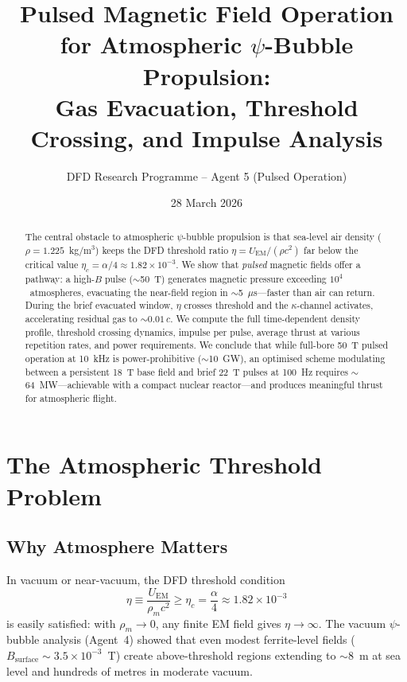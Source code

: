 \documentclass[amsmath,amssymb,aps,prd,superscriptaddress,nofootinbib]{revtex4-2}
\newcommand{\etac}{\eta_c}
\begin{document}
\title{Pulsed Magnetic Field Operation for Atmospheric $\psi$-Bubble Propulsion:\\
Gas Evacuation, Threshold Crossing, and Impulse Analysis}

\author{DFD Research Programme -- Agent 5 (Pulsed Operation)}
\date{28 March 2026}

\begin{abstract}
The central obstacle to atmospheric $\psi$-bubble propulsion is that
sea-level air density ($\rho = 1.225$~kg/m$^3$) keeps the DFD
threshold ratio $\eta = U_\text{EM}/(\rho c^2)$ far below the critical
value $\etac = \alpha/4 \approx 1.82 \times 10^{-3}$. We show that
\emph{pulsed} magnetic fields offer a pathway: a high-$B$ pulse
($\sim$50~T) generates magnetic pressure exceeding $10^4$~atmospheres,
evacuating the near-field region in $\sim$5~$\mu$s---faster than air can
return. During the brief evacuated window, $\eta$ crosses threshold and
the $\kappa$-channel activates, accelerating residual gas to $\sim
0.01\,c$. We compute the full time-dependent density profile, threshold
crossing dynamics, impulse per pulse, average thrust at various
repetition rates, and power requirements. We conclude that while
full-bore 50~T pulsed operation at 10~kHz is power-prohibitive ($\sim$10~GW),
an optimised scheme modulating between a persistent 18~T base field and
brief 22~T pulses at 100~Hz requires $\sim$64~MW---achievable with a
compact nuclear reactor---and produces meaningful thrust for atmospheric
flight.
\end{abstract}

\maketitle

\section{The Atmospheric Threshold Problem}\label{sec:problem}

\subsection{Why Atmosphere Matters}

In vacuum or near-vacuum, the DFD threshold condition
\begin{equation}\label{eq:threshold}
\eta \equiv \frac{U_\text{EM}}{\rho_m c^2} \geq \etac = \frac{\alpha}{4}
\approx 1.82 \times 10^{-3}
\end{equation}
is easily satisfied: with $\rho_m \to 0$, any finite EM field
gives $\eta \to \infty$. The vacuum $\psi$-bubble analysis (Agent~4)
showed that even modest ferrite-level fields ($B_\text{surface} \sim
3.5 \times 10^{-3}$~T) create above-threshold regions extending to
$\sim$8~m at sea level and hundreds of metres in moderate vacuum.
\end{document}
